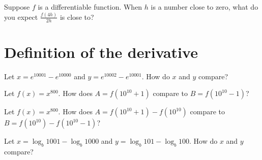 \documentclass{ximera}
\begin{document}
\begin{problem}
  Suppose $f$ is a differentiable function.  When $h$ is a number
  close to zero, what do you expect $\frac{f(4h)}{2h}$ is close to?
  \begin{multipleChoice}
  \end{multipleChoice}
\end{problem}

\clearpage

\section{Definition of the derivative}

\begin{problem}
  Let $x = e^{10001} - e^{10000}$ and $y = e^{10002} - e^{10001}$.  How do $x$ and $y$ compare?
  \begin{multipleChoice}
  \end{multipleChoice}
\end{problem}

\begin{problem}
  Let $f(x) = x^{800}$.  How does $A = f(10^{10} + 1)$ compare to $B = f(10^{10} - 1)$?
  \begin{multipleChoice}
  \end{multipleChoice}
\end{problem}

\begin{problem}
  Let $f(x) = x^{800}$.  How does $A = f(10^{10} + 1) - f(10^{10})$ compare to $B = f(10^{10}) - f(10^{10} - 1)$?
  \begin{multipleChoice}
  \end{multipleChoice}
\end{problem}

\begin{problem}
  Let $x = \log_b 1001 - \log_b 1000$ and $y = \log_b 101 - \log_b 100$.  How do $x$ and $y$ compare?
  \begin{multipleChoice}
  \end{multipleChoice}
\end{problem}
\end{document}

